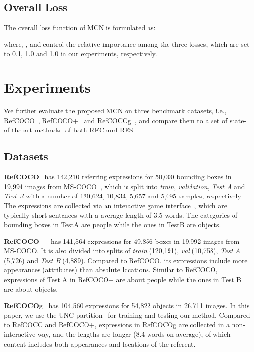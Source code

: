 \documentclass[10pt,twocolumn,letterpaper]{article}
\begin{document}
	
\subsection{Overall Loss}

The overall loss function of MCN is  formulated as:

where, ,  and  control the relative importance among the three losses, which are set to 0.1,  1.0 and 1.0 in our experiments, respectively.

\section{Experiments}
We further evaluate the proposed  MCN
on three benchmark datasets, i.e., RefCOCO~\cite{REFCOCO},
RefCOCO+~\cite{REFCOCO} and RefCOCOg~\cite{REFCOCOG}, and compare them
to a set of state-of-the-art methods~\cite{MATT:,wang2019neighbourhood,yang2019fast,CMSA,RRN} of both REC and RES.

\subsection{Datasets}
\textbf{RefCOCO}~\cite{REFCOCO} has 142,210 referring
expressions for 50,000 bounding boxes in 19,994 images
from MS-COCO~\cite{MSCOCO}, which is split into \emph{train}, \emph{validation},
\emph{Test A} and \emph{Test B} with a number of 120,624, 10,834, 5,657
and 5,095 samples, respectively. The expressions are collected
via an interactive game interface~\cite{REFCOCO}, which are
typically short sentences with a average length of 3.5 words.
The categories of bounding boxes in TestA are people while
the ones in TestB are objects.

\textbf{RefCOCO+}~\cite{REFCOCO} has 141,564 expressions for 49,856
boxes in 19,992 images from MS-COCO. It is also divided
into splits of \emph{train} (120,191), \emph{val} (10,758), \emph{Test A} (5,726)
and \emph{Test B} (4,889). Compared to RefCOCO, its expressions
include more appearances (attributes) than absolute
locations. Similar to RefCOCO, expressions of Test A in RefCOCO+ are about people
while the ones in Test B are about objects.

\textbf{RefCOCOg}~\cite{REFCOCOG,nagaraja2016modeling} has 104,560 expressions for 54,822
objects in 26,711 images. In this paper, we use the UNC partition~\cite{nagaraja2016modeling}  for training and testing our method. 
Compared to RefCOCO and RefCOCO+, expressions in
RefCOCOg are collected in a non-interactive way, and the
lengths are longer (8.4 words on average), of which content
includes both appearances and locations of the referent.
\end{document}
